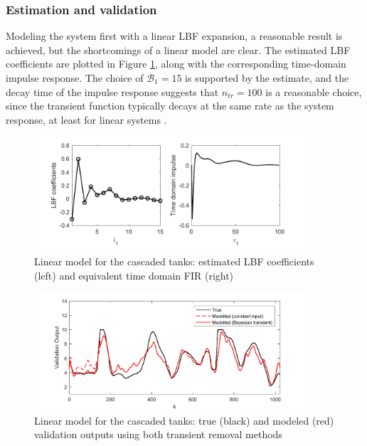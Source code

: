 \subsubsection{Estimation and validation}

Modeling the system first with a linear LBF expansion, a reasonable result is achieved, but the shortcomings of a linear model are clear. The estimated LBF coefficients are plotted in Figure \ref{fig:LinearTankEst}, along with the corresponding time-domain impulse response. The choice of $\mathcal{B}_1=15$ is supported by the estimate, and the decay time of the impulse response suggests that $n_{tr}=100$ is a reasonable choice, since the transient function typically decays at the same rate as the system response, at least for linear systems \cite{Lataire2016}.

\begin{figure}[h]
\centering
\includegraphics[width=0.9\textwidth]{Chapter6_CaseStudies/LinearLBFs.pdf}
\caption{Linear model for the cascaded tanks: estimated LBF coefficients (left) and equivalent time domain FIR (right)}
\label{fig:LinearTankEst}
\end{figure}

\begin{figure}[h]
\centering
\includegraphics[width=0.9\textwidth]{Chapter6_CaseStudies/LinearValidation.pdf}
\caption{Linear model for the cascaded tanks: true (black) and modeled (red) validation outputs using both transient removal methods}
\label{fig:LinearTankVal}
\end{figure}

